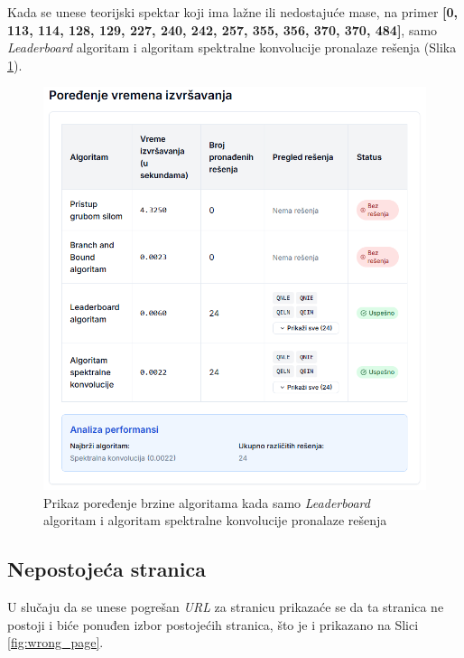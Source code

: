 \documentclass[12pt,oneside]{memoir}
\begin{document}
Kada se unese teorijski spektar koji ima lažne ili nedostajuće mase, na primer \textbf{[0, 113, 114, 128, 129, 227, 240, 242, 257, 355, 356, 370, 370, 484]}, samo \emph{Leaderboard} algoritam i algoritam spektralne konvolucije pronalaze rešenja (Slika \ref{fig:comparison}).
\begin{figure}[H]
\centering
\includegraphics[width=1\textwidth]{images/comparison.png}
\caption{Prikaz poređenje brzine algoritama kada samo \emph{Leaderboard} algoritam i algoritam spektralne konvolucije pronalaze rešenja}
\label{fig:comparison}
\end{figure}

\subsection{Nepostojeća stranica}

U slučaju da se unese pogrešan \emph{URL} za stranicu prikazaće se da ta stranica ne postoji i biće ponuđen izbor postojećih stranica, što je i prikazano na Slici \ref{fig:wrong_page}.
\end{document}
